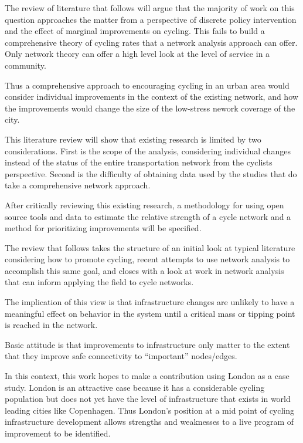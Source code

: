 \documentclass[11pt]{article} %
\begin{document}
 The review of literature that follows will argue that the majority of work on this question approaches the matter from a perspective of discrete policy intervention and the effect of marginal improvements on cycling. This fails to build a comprehensive theory of cycling rates that a network analysis approach can offer. Only network theory can offer a high level look at the level of service in a community. 

Thus a comprehensive approach to encouraging cycling in an urban area would consider individual improvements in the context of the existing network, and how the improvements would change the size of the low-stress nework coverage of the city. 

This literature review will show that existing research is limited by two considerations. First is the scope of the analysis, considering individual changes instead of the status of the entire transportation network from the cyclists perspective.  Second is the difficulty of obtaining data used by the studies that do take a comprehensive network approach. 

After critically reviewing this existing research, a methodology for using open source tools and data to estimate the relative strength of a cycle network and a method for prioritizing improvements will be specified. 

The review that follows takes the structure of an initial look at typical literature considering how to promote cycling, recent attempts to use network analysis to accomplish this same goal, and closes with a look at work in network analysis that can inform applying the field to cycle networks.

 The implication of this view is that infrastructure changes are unlikely to have a meaningful effect on behavior in the system until a critical mass or tipping point is reached in the network. 

Basic attitude is that improvements to infrastructure only matter to the extent that they improve safe connectivity to ``important'' nodes/edges. 


 

In this context, this work hopes to make a contribution using London as a case study. London is an attractive case because it has a considerable cycling population but does not yet have the level of infrastructure that exists in world leading cities like Copenhagen. Thus London's position at a mid point of cycling infrastructure development allows strengths and weaknesses to a live program of improvement to be identified. 
\end{document}
